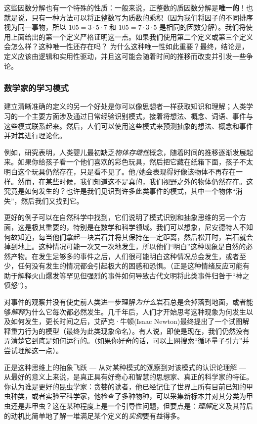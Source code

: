 这些因数分解也有一个特殊的性质：一般来说，正整数的质因数分解是\textbf{唯一的}！也就是说，只有一种方法可以将正整数写为质数的乘积（因为我们将因子的不同排序视为同一事物，所以 $105 = 3 \cdot 5 \cdot 7$ 和 $105 = 7 \cdot 3 \cdot 5$ 是相同的因数分解）。我们将使用上面给出的第一个定义严格证明这一点。如果我们使用第二个定义或第三个定义会怎么样？这种唯一性还存在吗？ 为什么这种唯一性如此重要？最终，结论是，定义应该由逻辑和实用性驱动，并且这可能会随着时间的推移而改变并引发一些争论。

\subsubsection*{数学家的学习模式}

建立清晰准确的定义的另一个好处是你可以像思想者一样获取知识和理解；人类学习的一个主要方面涉及通过日常经验识别模式，接着将想法、概念、词语、事件与这些模式联系起来。然后，人们可以使用这些模式来预测抽象的想法、概念和事件并对其进行理论化。

例如，研究表明，人类婴儿最初缺乏\emph{物体存继性}概念，随着时间的推移逐渐发展起来。如果你给孩子看一个他们喜欢的彩色玩具，然后把它藏在纸箱下面，孩子不太明白这个玩具仍然存在，只是看不见了。他/她会表现得好像该物体不再存在一样。然而，在某些时候，我们知道这不是真的，我们视野之外的物体仍然存在。这究竟是如何发生的？也许是我们见识到许多此类事件的模式，其中一个物体``消失''，然后我们又找到它。

更好的例子可以在自然科学中找到，它们说明了模式识别和抽象思维的另一个方面，这是极其重要的，特别是在数学和科学领域。我们可以想象，尼安德特人不知何故知道，每当他们拿起一块岩石并将其保持在一定距离，然后松开时，岩石就会掉到地上。这种情况可能一次又一次地发生，所以他们``明白''这种现象是自然的必然产物。在发生足够多的事件之后，人们很可能明白这种情况总会发生，或者至少，任何没有发生的情况都会引起极大的困惑和恐惧。（正是这种情绪反应可能有助于解释火山爆发等罕见但强烈的事件如何导致古代文明将此类事件归咎于``神之愤怒''）。

对事件的观察并没有使史前人类进一步理解\emph{为什么}岩石总是会掉落到地面，或者能够\emph{解释}为什么它每次都必然发生。几千年后，人们才开始思考这种现象为何发生以及如何发生，更长时间之后，艾萨克·牛顿(Isaac Newton)最终提出了一个试图解释重力行为的模型（最终为此类现象命名）。有人说，即使是现在，我们仍然没有弄清楚它到底是如何运行的。（如果你好奇的话，可以上网搜索``循环量子引力''并尝试理解这一点）。

正是这种思维上的抽象飞跃 --- 从对某种模式的观察到对该模式的认识论理解 --- 从最好的意义上来说，是真正具有好奇心和智慧的思想家、真正的科学家的特征。你认为谁是更好的昆虫学家：贪婪的读者，他已经记住了世界上所有目前已知的甲虫种类，或者实验室科学家，他检查了多种物种，可以采集新标本并对其分类为甲虫还是非甲虫？这在某种程度上是一个引导性问题，但要点是：\emph{理解}定义及其背后的动机比简单地了解一堆满足某个定义的\emph{实例}要有益得多。

